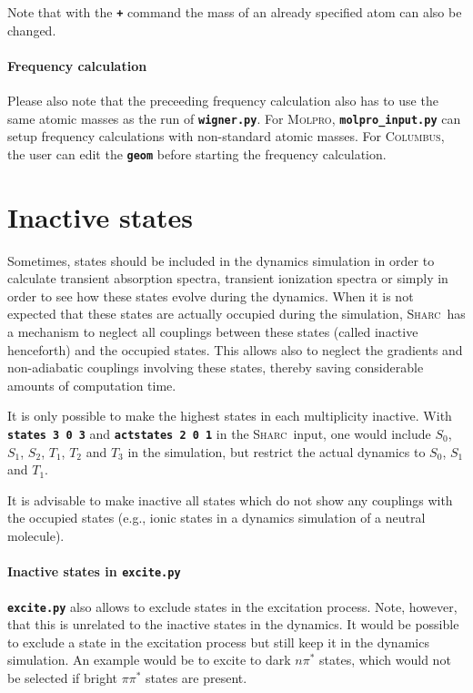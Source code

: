\documentclass[a4paper,11pt,DIV=15,openany]{scrbook}
\newcommand{\sharc}{\textsc{Sharc}}
\newcommand{\ttt}[1]{\textbf{\texttt{#1}}}
\begin{document}
\normalsize
Note that with the \ttt{+} command the mass of an already specified atom can also be changed. 

\paragraph{Frequency calculation}

Please also note that the preceeding frequency calculation also has to use the same atomic masses as the run of \ttt{wigner.py}. For \textsc{Molpro}, \ttt{molpro\_input.py} can setup frequency calculations with non-standard atomic masses. For \textsc{Columbus}, the user can edit the \ttt{geom} before starting the frequency calculation.


\section{Inactive states}

Sometimes, states should be included in the dynamics simulation in order to calculate transient absorption spectra, transient ionization spectra or simply in order to see how these states evolve during the dynamics. When it is not expected that these states are actually occupied during the simulation, \sharc\ has a mechanism to neglect all couplings between these states (called inactive henceforth) and the occupied states. This allows also to neglect the gradients and non-adiabatic couplings involving these states, thereby saving considerable amounts of computation time. 

It is only possible to make the highest states in each multiplicity inactive. With \ttt{states 3 0 3} and \ttt{actstates 2 0 1} in the \sharc\ input, one would include $S_0$, $S_1$, $S_2$, $T_1$, $T_2$ and $T_3$ in the simulation, but restrict the actual dynamics to $S_0$, $S_1$ and $T_1$.

It is advisable to make inactive all states which do not show any couplings with the occupied states (e.g., ionic states in a dynamics simulation of a neutral molecule). 

\paragraph{Inactive states in \ttt{excite.py}}

\ttt{excite.py} also allows to exclude states in the excitation process. Note, however, that this is unrelated to the inactive states in the dynamics. It would be possible to exclude a state in the excitation process but still keep it in the dynamics simulation. An example would be to excite to dark $n\pi^*$ states, which would not be selected if bright $\pi\pi^*$ states are present.
\end{document}
